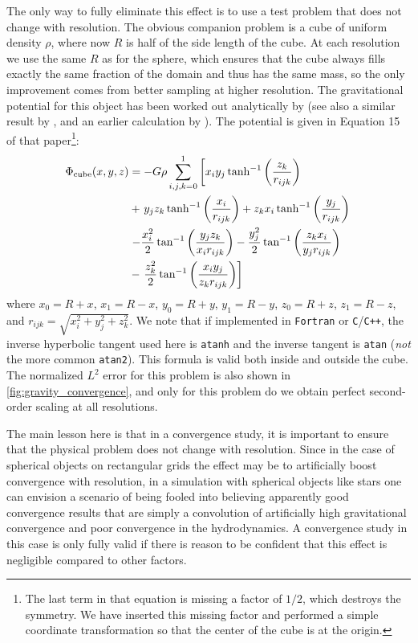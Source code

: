 \documentclass[12pt]{article}
\begin{document}
The only way to fully eliminate this effect is to use a test problem that
does not change with resolution. The obvious companion problem is a cube of
uniform density $\rho$, where now $R$ is half of the side length of
the cube. At each resolution we use the same $R$ as for the sphere,
which ensures that the cube always fills exactly the same fraction of
the domain and thus has the same mass, so the only improvement comes
from better sampling at higher resolution. The gravitational potential for this
object has been worked out analytically by \citet{waldvogel:1976} (see
also a similar result by \citet{hummer:1996}, and an earlier calculation 
by \citet{macmillan:1958}). The potential is given in
Equation 15 of that paper\footnote{The last term in that equation is missing a factor of
$1/2$, which destroys the symmetry. We have inserted this missing factor and
performed a simple coordinate transformation so that the center of
the cube is at the origin.}:
\begin{align}
  \Phi_{\text{cube}}(x,y,z) &= -G\rho\sum_{i,j,k=0}^1\left[x_i y_j\, \text{tanh}^{-1}\left(\frac{z_k}{r_{ijk}}\right)\right. \notag \\
  &+ \left. y_j z_k\, \text{tanh}^{-1}\left(\frac{x_i}{r_{ijk}}\right) + z_k x_i\, \text{tanh}^{-1}\left(\frac{y_j}{r_{ijk}}\right) \right.\notag \\
  &\left. - \frac{x_i^2}{2}\,\text{tan}^{-1}\left(\frac{y_j z_k}{x_i r_{ijk}}\right) - \frac{y_j^2}{2}\,\text{tan}^{-1}\left(\frac{z_k x_i}{y_j r_{ijk}}\right) \right. \notag \\
  &- \left. \frac{z_k^2}{2}\,\text{tan}^{-1}\left(\frac{x_i y_j}{z_k r_{ijk}}\right)\right]
\end{align}
where $x_0 = R + x$, $x_1 = R - x$, $y_0 = R + y$, 
$y_1 = R - y$, $z_0 = R + z$, $z_1 = R - z$, 
and $r_{ijk} = \sqrt{x_i^2 + y_j^2 + z_k^2}$. We note that if implemented in 
\texttt{Fortran} or \texttt{C}/\texttt{C++}, the inverse hyperbolic tangent used here is
\texttt{atanh} and the inverse tangent is \texttt{atan} (\textit{not} the more common
\texttt{atan2}). This formula is valid both inside and outside the
cube. The normalized $L^2$ error for this problem is also shown
in \autoref{fig:gravity_convergence}, and only for this problem 
do we obtain perfect second-order scaling at all resolutions.

The main lesson here is that in a convergence study, it is important
to ensure that the physical problem does not change with
resolution. Since in the case of spherical objects on rectangular
grids the effect may be to artificially boost convergence with resolution,
in a simulation with spherical objects like stars one can envision a
scenario of being fooled into believing apparently good convergence
results that are simply a convolution of artificially high
gravitational convergence and poor convergence in the hydrodynamics. A
convergence study in this case is only fully valid if there is reason
to be confident that this effect is negligible compared to other
factors.
\end{document}
